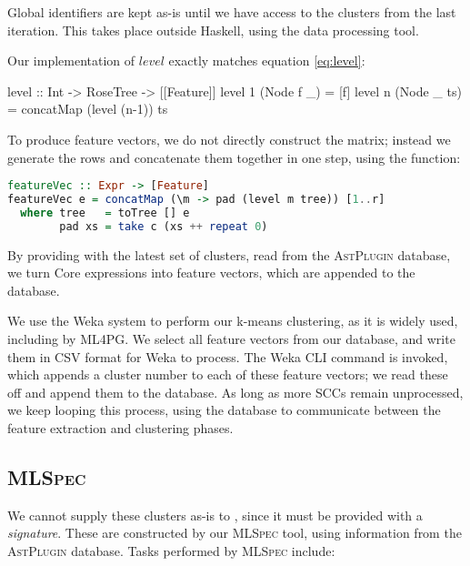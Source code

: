 Global identifiers are kept as-is until we have access to the clusters from the last iteration. This takes place outside Haskell, using the  data processing tool.

Our implementation of $level$ exactly matches equation \ref{eq:level}:

\begin{haskell}
level :: Int -> RoseTree -> [[Feature]]
level 1 (Node f _)  = [f]
level n (Node _ ts) = concatMap (level (n-1)) ts
\end{haskell}

To produce feature vectors, we do not directly construct the matrix; instead we generate the rows and concatenate them together in one step, using the  function:

\begin{lstlisting}[language=Haskell, xleftmargin=0.1\textwidth, xrightmargin=0.1\textwidth]
featureVec :: Expr -> [Feature]
featureVec e = concatMap (\m -> pad (level m tree)) [1..r]
  where tree   = toTree [] e
        pad xs = take c (xs ++ repeat 0)
\end{lstlisting}

By providing  with the latest set of clusters, read from the \textsc{AstPlugin} database, we turn Core expressions into feature vectors, which are appended to the database.

We use the Weka system to perform our k-means clustering, as it is widely used, including by ML4PG. We select all feature vectors from our database, and write them in CSV format for Weka to process. The Weka CLI command is invoked, which appends a cluster number to each of these feature vectors; we read these off and append them to the database. As long as more SCCs remain unprocessed, we keep looping this process, using the database to communicate between the feature extraction and clustering phases.

\subsection{\textsc{MLSpec}}
\label{sec:mlspec}

We cannot supply these clusters as-is to \qspec{}, since it must be provided with a \emph{signature}. These are constructed by our \textsc{MLSpec} tool, using information from the \textsc{AstPlugin} database. Tasks performed by \textsc{MLSpec} include:

